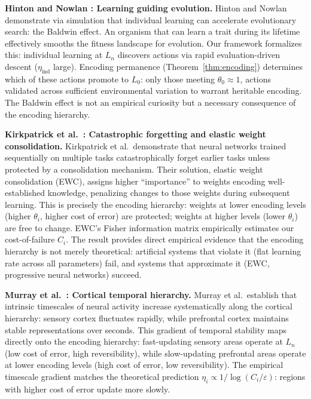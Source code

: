 \documentclass[11pt]{article}
\theoremstyle{definition}
\begin{document}
\textbf{Hinton and Nowlan \cite{Hinton1987}: Learning guiding
evolution.}
Hinton and Nowlan demonstrate via simulation that individual learning
can accelerate evolutionary search: the Baldwin effect. An
organism that can learn a trait during its lifetime effectively
smooths the fitness landscape for evolution. Our framework formalizes
this: individual learning at $L_n$ discovers actions via rapid
evaluation-driven descent ($\eta_{\mathrm{ind}}$ large). Encoding permanence
(Theorem~\ref{thm:encoding}) determines which of these actions
promote to $L_0$: only those meeting $\theta_0 \approx 1$, actions
validated across sufficient environmental variation to warrant
heritable encoding. The Baldwin effect is not an empirical curiosity
but a necessary consequence of the encoding hierarchy.

\textbf{Kirkpatrick et al.\ \cite{Kirkpatrick2017}: Catastrophic
forgetting and elastic weight consolidation.}
Kirkpatrick et al.\ demonstrate that neural networks trained
sequentially on multiple tasks catastrophically forget earlier tasks
unless protected by a consolidation mechanism. Their solution,
elastic weight consolidation (EWC), assigns higher ``importance''
to weights encoding well-established knowledge, penalizing changes to
those weights during subsequent learning. This is precisely the
encoding hierarchy: weights at lower encoding levels (higher
$\theta_i$, higher cost of error) are protected; weights at higher
levels (lower $\theta_i$) are free to change. EWC's Fisher information
matrix empirically estimates our cost-of-failure $C_i$.
The result provides direct empirical evidence that the encoding
hierarchy is not merely theoretical: artificial systems that violate
it (flat learning rate across all parameters) fail, and systems that
approximate it (EWC, progressive neural networks) succeed.

\textbf{Murray et al.\ \cite{Murray2014}: Cortical temporal
hierarchy.}
Murray et al.\ establish that intrinsic timescales of neural
activity increase systematically along the cortical hierarchy: sensory
cortex fluctuates rapidly, while prefrontal cortex maintains stable
representations over seconds. This gradient of temporal stability maps
directly onto the encoding hierarchy: fast-updating sensory areas
operate at $L_n$ (low cost of error, high reversibility), while
slow-updating prefrontal areas operate at lower encoding levels (high
cost of error, low reversibility). The empirical timescale gradient
matches the theoretical prediction $\eta_i \propto 1/\log(C_i /
\varepsilon)$: regions with higher cost of error update more slowly.
\end{document}
